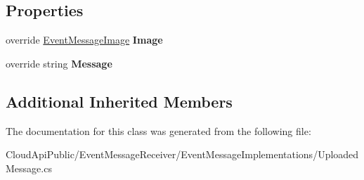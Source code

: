 \subsection*{Properties}
\begin{DoxyCompactItemize}
\item 
\hypertarget{class_cloud_api_public_1_1_event_message_receiver_1_1_uploaded_message_a4afe03a73873646f46d20239b04e7ed6}{override \hyperlink{namespace_cloud_api_public_1_1_static_aefcc1e7e1c81366ec3f6affd41c1f817}{Event\-Message\-Image} {\bfseries Image}}\label{class_cloud_api_public_1_1_event_message_receiver_1_1_uploaded_message_a4afe03a73873646f46d20239b04e7ed6}

\item 
\hypertarget{class_cloud_api_public_1_1_event_message_receiver_1_1_uploaded_message_a626d529a4027cf478db3c476f20ce3ca}{override string {\bfseries Message}}\label{class_cloud_api_public_1_1_event_message_receiver_1_1_uploaded_message_a626d529a4027cf478db3c476f20ce3ca}

\end{DoxyCompactItemize}
\subsection*{Additional Inherited Members}


The documentation for this class was generated from the following file\-:\begin{DoxyCompactItemize}
\item 
Cloud\-Api\-Public/\-Event\-Message\-Receiver/\-Event\-Message\-Implementations/Uploaded\-Message.\-cs\end{DoxyCompactItemize}
